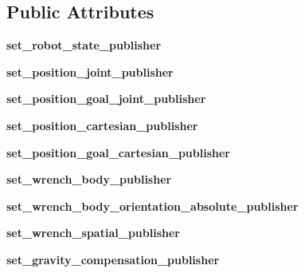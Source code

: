 \subsection*{Public Attributes}
\begin{DoxyCompactItemize}
\item 
\hypertarget{classarm_1_1arm_a3af4a73708304dfb539ce3a0b34477a3}{{\bfseries set\-\_\-robot\-\_\-state\-\_\-publisher}}\label{classarm_1_1arm_a3af4a73708304dfb539ce3a0b34477a3}

\item 
\hypertarget{classarm_1_1arm_a3b69cb95dabe0d299c5df1587f777324}{{\bfseries set\-\_\-position\-\_\-joint\-\_\-publisher}}\label{classarm_1_1arm_a3b69cb95dabe0d299c5df1587f777324}

\item 
\hypertarget{classarm_1_1arm_af091f81c9b8f0e3d840007e9a58cc783}{{\bfseries set\-\_\-position\-\_\-goal\-\_\-joint\-\_\-publisher}}\label{classarm_1_1arm_af091f81c9b8f0e3d840007e9a58cc783}

\item 
\hypertarget{classarm_1_1arm_a49910ed075b7bc8b59299ef12d1b574a}{{\bfseries set\-\_\-position\-\_\-cartesian\-\_\-publisher}}\label{classarm_1_1arm_a49910ed075b7bc8b59299ef12d1b574a}

\item 
\hypertarget{classarm_1_1arm_a97437865e96c6505b4cb96510b1fabc2}{{\bfseries set\-\_\-position\-\_\-goal\-\_\-cartesian\-\_\-publisher}}\label{classarm_1_1arm_a97437865e96c6505b4cb96510b1fabc2}

\item 
\hypertarget{classarm_1_1arm_a9ec118079a66acd8ce413bd84d13ac4d}{{\bfseries set\-\_\-wrench\-\_\-body\-\_\-publisher}}\label{classarm_1_1arm_a9ec118079a66acd8ce413bd84d13ac4d}

\item 
\hypertarget{classarm_1_1arm_a307144d2dbb872474841694dc9769645}{{\bfseries set\-\_\-wrench\-\_\-body\-\_\-orientation\-\_\-absolute\-\_\-publisher}}\label{classarm_1_1arm_a307144d2dbb872474841694dc9769645}

\item 
\hypertarget{classarm_1_1arm_ad56c26e45bdc6da624e3d33faf919659}{{\bfseries set\-\_\-wrench\-\_\-spatial\-\_\-publisher}}\label{classarm_1_1arm_ad56c26e45bdc6da624e3d33faf919659}

\item 
\hypertarget{classarm_1_1arm_a1822b878d25777ec4d7c88d0f9521ae3}{{\bfseries set\-\_\-gravity\-\_\-compensation\-\_\-publisher}}\label{classarm_1_1arm_a1822b878d25777ec4d7c88d0f9521ae3}


\end{DoxyCompactItemize}
